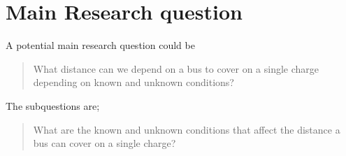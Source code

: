 \documentclass[12pt,a4paper]{article}
\begin{document}
\section{Main Research question}
A potential main research question could be \\
\begin{quote}
    What distance can we depend on a bus to cover on a single charge depending on known and unknown conditions? \\
\end{quote}

The subquestions are;
\begin{quote}
    What are the known and unknown conditions that affect the distance a bus can cover on a single charge? \\
\end{quote}
\end{document}
